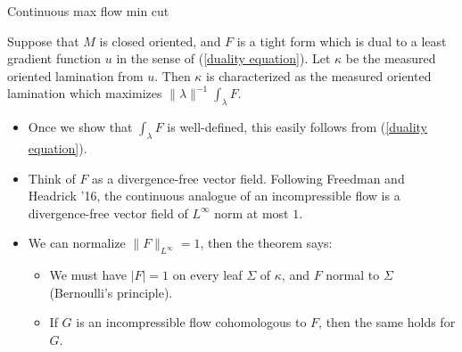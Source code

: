 \documentclass[10pt]{beamer}
\begin{document}
\begin{frame}{Continuous max flow min cut}
\begin{theorem}[B, in preparation]
Suppose that $M$ is closed oriented, and $F$ is a tight form which is dual to a least gradient function $u$ in the sense of (\ref{duality equation}).
Let $\kappa$ be the measured oriented lamination from $u$.
Then $\kappa$ is characterized as the measured oriented lamination which maximizes $\|\lambda\|^{-1} \int_\lambda F$.
\end{theorem} \pause

\begin{itemize}
\item Once we show that $\int_\lambda F$ is well-defined, this easily follows from (\ref{duality equation}). \pause
\item Think of $F$ as a divergence-free vector field. Following Freedman and Headrick '16, the continuous analogue of an incompressible flow is a divergence-free vector field of $L^\infty$ norm at most $1$. \pause
\item We can normalize $\|F\|_{L^\infty} = 1$, then the theorem says: \pause
\begin{itemize}
\item We must have $|F| = 1$ on every leaf $\Sigma$ of $\kappa$, and $F$ normal to $\Sigma$ (Bernoulli's principle). \pause
\item If $G$ is an incompressible flow cohomologous to $F$, then the same holds for $G$.
\end{itemize}
\end{itemize}
\end{frame}
\end{document}
